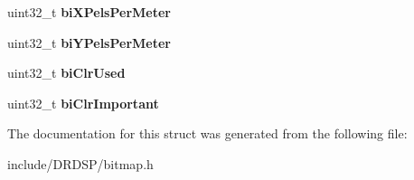 \begin{DoxyCompactItemize}
\item 
\hypertarget{struct_d_r_d_s_p_1_1bmp_info_head_a813fb6d6ab7c241912f53af95d0b868a}{uint32\-\_\-t {\bfseries bi\-X\-Pels\-Per\-Meter}}\label{struct_d_r_d_s_p_1_1bmp_info_head_a813fb6d6ab7c241912f53af95d0b868a}

\item 
\hypertarget{struct_d_r_d_s_p_1_1bmp_info_head_acbad99b88a6803a7b516be33160ee5f8}{uint32\-\_\-t {\bfseries bi\-Y\-Pels\-Per\-Meter}}\label{struct_d_r_d_s_p_1_1bmp_info_head_acbad99b88a6803a7b516be33160ee5f8}

\item 
\hypertarget{struct_d_r_d_s_p_1_1bmp_info_head_a0fe21a35ead9b01934b0420aa9073735}{uint32\-\_\-t {\bfseries bi\-Clr\-Used}}\label{struct_d_r_d_s_p_1_1bmp_info_head_a0fe21a35ead9b01934b0420aa9073735}

\item 
\hypertarget{struct_d_r_d_s_p_1_1bmp_info_head_a178198822e39c34c07339af43e96613e}{uint32\-\_\-t {\bfseries bi\-Clr\-Important}}\label{struct_d_r_d_s_p_1_1bmp_info_head_a178198822e39c34c07339af43e96613e}

\end{DoxyCompactItemize}


The documentation for this struct was generated from the following file\-:\begin{DoxyCompactItemize}
\item 
include/\-D\-R\-D\-S\-P/bitmap.\-h\end{DoxyCompactItemize}
